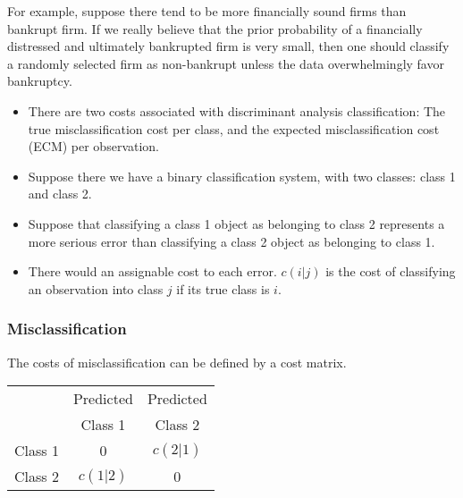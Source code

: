 \documentclass[PredictiveAnalytics101.tex]{subfiles}
\begin{document}
\begin{frame}
For example, suppose there tend to be more financially sound firms than bankrupt
firm. If we really believe that the prior probability of a financially
distressed and ultimately bankrupted firm is very small, then one should
classify a randomly selected firm as non-bankrupt unless the data
overwhelmingly favor bankruptcy.
\end{frame}
\begin{frame}

\begin{itemize}
\item There are two costs associated with discriminant analysis classification: The true misclassification cost per class, and the expected misclassification cost (ECM) per observation.

\item Suppose there we have a binary classification system, with two classes: class 1 and class 2.

\item Suppose that classifying a class 1 object as belonging to class 2 represents a more serious error than classifying a class 2 object as belonging to class 1. 

\item There would an assignable cost to each error.
$c(i|j)$ is the cost of classifying an observation into class $j$ if its true class is $i$.
\end{itemize}

\end{frame}
\begin{frame}
\frametitle{Misclassification}
The costs of misclassification can be defined by a cost matrix.
{
\LARGE
\begin{center}
\begin{tabular}{|c|c|c|}
	\hline
	& Predicted & Predicted \\
	& Class 1 & Class 2 \\  \hline
	Class 1 & 0 & $c(2|1)$  \\ \hline
	Class 2 & $c(1|2)$ & 0 \\
	\hline
\end{tabular}
\end{center}
}


\end{frame}
\end{document}
